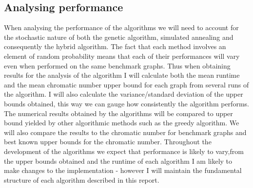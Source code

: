 \documentclass[12pt,a4paper]{article}
\begin{document}
\subsection*{Analysing performance}
When analysing the performance of the algorithms we will need to account for the stochastic nature of both the genetic algorithm, simulated annealing and consequently the hybrid algorithm. The fact that each method involves an element of random probability means that each of their performances will vary even when performed on the same benchmark graphs. Thus when obtaining results for the analysis of the algorithm I will calculate both the mean runtime and the mean chromatic number upper bound for each graph from several runs of the algorithm. I will also calculate the variance/standard deviation of the upper bounds obtained, this way we can gauge how consistently the algorithm performs. The numerical results obtained by the algorithms will be compared to upper bound yielded by other algorithmic methods such as the greedy algorithm. We will also compare the results to the chromatic number for benchmark graphs and best known upper bounds for the chromatic number. Throughout the development of the algorithms we expect that performance is likely to vary,from the upper bounds obtained and the runtime of each algorithm I am likely to make changes to the implementation - however I will maintain the fundamental structure of each algorithm described in this report.
\end{document}
